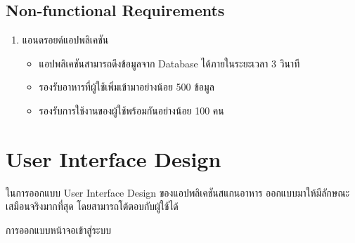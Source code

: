 \subsection{Non-functional Requirements}
		\begin{enumerate}
		\item แอนดรอยด์แอปพลิเคชัน
		\begin{itemize}[label={--}]
			\item  แอปพลิเคชันสามารถดึงข้อมูลจาก Database ได้ภายในระยะเวลา 3 วินาที 
			\item  รองรับอาหารที่ผู้ใช้เพิ่มเข้ามาอย่างน้อย 500 ข้อมูล
			\item รองรับการใช้งานของผู้ใช้พร้อมกันอย่างน้อย 100 คน
		\end{itemize}
	\end{enumerate}
	
\section{User Interface Design}
ในการออกแบบ User Interface Design ของแอปพลิเคชันสแกนอาหาร ออกแบบมาให้มีลักษณะเสมือนจริงมากที่สุด โดยสามารถโต้ตอบกับผู้ใช้ได้ 
\item การออกแบบหน้าจอเข้าสู่ระบบ

